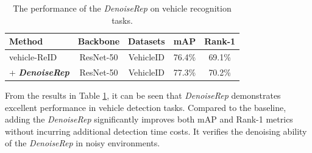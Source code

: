 \documentclass[conference]{IEEEtran}
\begin{document}
{\begin{table}[ht!]
\centering
\caption{The performance of the \textit{DenoiseRep} on vehicle recognition tasks.}
\label{tab: Vehicle Identification}
\vspace{0.2cm}
\renewcommand{\arraystretch}{1.2} %
\begin{tabular}{l|c|c|c|c}
\hline \hline
Method & Backbone & Datasets & mAP & Rank-1 \\
\hline
vehicle-ReID & ResNet-50 & VehicleID & 76.4\% & 69.1\% \\
+ \textit{\textbf{DenoiseRep}} & ResNet-50 & VehicleID & 77.3\% & 70.2\% \\
\hline \hline
\end{tabular}
\end{table}

From the results in Table \ref{tab: Vehicle Identification}, it can be seen that \textit{DenoiseRep} demonstrates excellent performance in vehicle detection tasks. Compared to the baseline, adding the \textit{DenoiseRep} significantly improves both mAP and Rank-1 metrics without incurring additional detection time costs. It verifies the denoising ability of the \textit{DenoiseRep} in noisy environments.


}
\end{document}
